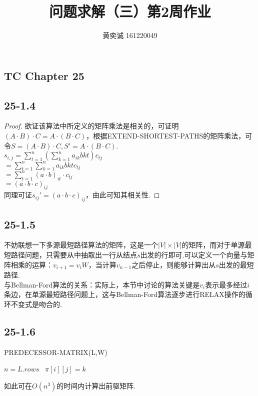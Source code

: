 \documentclass[twocolumn]{article}
\newenvironment{SChinese}{%
	\CJKfamily{gbsn}%
	\CJKtilde
	\CJKnospace}{}
\begin{document}
	\begin{CJK}{UTF8}{}	
		\begin{SChinese}	
			\title{问题求解（三）第2周作业}
			\author{黄奕诚 161220049}
			
			\maketitle
			\section*{TC Chapter 25}
			\subsection*{25-1.4}
			\begin{proof}
				欲证该算法中所定义的矩阵乘法是相关的，可证明$(A\cdot B)\cdot C = A\cdot(B\cdot C)$，根据EXTEND-SHORTEST-PATHS的矩阵乘法，可令$S = (A\cdot B)\cdot C,S'=A\cdot(B\cdot C)$.\\
				$s_{i,j}=\sum_{t=1}^{n}(\sum_{k=1}^{n}a_{ik}b{kt})c_{tj}$ \\
				$ = \sum_{t=1}^{n}\sum_{k=1}^{n}a_{ik}b{kt}c_{tj}$ \\
				$ = \sum_{t=1}^{n}(a\cdot b)_{it}\cdot c_{tj}$ \\
				$ = (a\cdot b\cdot c)_{ij}$\\
				同理可证$s_{ij}' = (a\cdot b\cdot c)_{ij}$，由此可知其相关性.
			\end{proof}
			\subsection*{25-1.5}
				不妨联想一下多源最短路径算法的矩阵，这是一个$|V|\times|V|$的矩阵，而对于单源最短路径问题，只需要从中抽取出一行从结点$s$出发的行即可.可以定义一个向量与矩阵相乘的运算：$v_{i+1} = v_iW$，当计算$v_{n-1}$之后停止，则能够计算出从$s$出发的最短路径.\\
				与Bellman-Ford算法的关系：实际上，本节中讨论的算法关键是$v_i$表示最多经过$i$条边，在单源最短路径问题上，这与Bellman-Ford算法逐步进行RELAX操作的循环不变式是吻合的.
			\subsection*{25-1.6}
				\begin{algorithm}[]
				\caption{PREDECESSOR-MATRIX(L,W)}
				\begin{algorithmic}[1]
					\STATE $n = L.rows$\
					\STATE $\pi[i][j] = k$\
					\ENDIF
					\ENDFOR
					\ENDFOR
					\ENDFOR
				\end{algorithmic}
				\end{algorithm}
			如此可在$O(n^3)$的时间内计算出前驱矩阵.

\end{SChinese}
\end{CJK}
\end{document}
